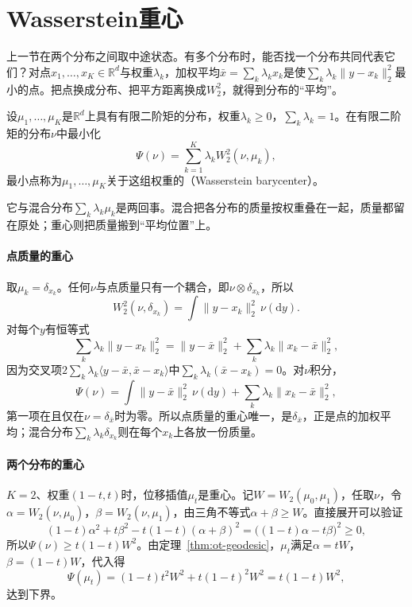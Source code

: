 \section{Wasserstein重心}
\label{sec:ot-barycenter}

上一节在两个分布之间取中途状态。有多个分布时，能否找一个分布共同代表它们？对点$x_1,\dots,x_K\in\mathbb{R}^{d}$与权重$\lambda_k$，加权平均$\bar{x}=\sum_k\lambda_kx_k$是使$\sum_k\lambda_k\lVert y-x_k\rVert_2^{2}$最小的点。把点换成分布、把平方距离换成$W_2^{2}$，就得到分布的“平均”。

\begin{definition}[Wasserstein重心]
\label{def:ot-barycenter}
设$\mu_1,\dots,\mu_K$是$\mathbb{R}^{d}$上具有有限二阶矩的分布，权重$\lambda_k\geq0$，$\sum_k\lambda_k=1$。在有限二阶矩的分布$\nu$中最小化
\begin{equation}
 \Psi(\nu)=\sum_{k=1}^{K}\lambda_kW_2^{2}(\nu,\mu_k),
 \label{eq:ot-barycenter}
\end{equation}
最小点称为$\mu_1,\dots,\mu_K$关于这组权重的（Wasserstein barycenter）。
\end{definition}

它与混合分布$\sum_k\lambda_k\mu_k$是两回事。混合把各分布的质量按权重叠在一起，质量都留在原处；重心则把质量搬到“平均位置”上。

\paragraph{点质量的重心}
取$\mu_k=\delta_{x_k}$。任何$\nu$与点质量只有一个耦合，即$\nu\otimes\delta_{x_k}$，所以
\[
 W_2^{2}(\nu,\delta_{x_k})=\int\lVert y-x_k\rVert_2^{2}\,\nu(\mathrm{d}y).
\]对每个$y$有恒等式
\[
 \sum_k\lambda_k\lVert y-x_k\rVert_2^{2}=\lVert y-\bar{x}\rVert_2^{2}+\sum_k\lambda_k\lVert x_k-\bar{x}\rVert_2^{2},
\]
因为交叉项$2\sum_k\lambda_k\langle y-\bar{x},\bar{x}-x_k\rangle$中$\sum_k\lambda_k(\bar{x}-x_k)=0$。对$\nu$积分，
\[
 \Psi(\nu)=\int\lVert y-\bar{x}\rVert_2^{2}\,\nu(\mathrm{d}y)+\sum_k\lambda_k\lVert x_k-\bar{x}\rVert_2^{2},
\]
第一项在且仅在$\nu=\delta_{\bar{x}}$时为零。所以点质量的重心唯一，是$\delta_{\bar{x}}$，正是点的加权平均；混合分布$\sum_k\lambda_k\delta_{x_k}$则在每个$x_k$上各放一份质量。

\paragraph{两个分布的重心}
$K=2$、权重$(1-t,t)$时，位移插值$\mu_t$是重心。记$W=W_2(\mu_0,\mu_1)$，任取$\nu$，令$\alpha=W_2(\nu,\mu_0)$，$\beta=W_2(\nu,\mu_1)$，由三角不等式$\alpha+\beta\geq W$。直接展开可以验证
\[
 (1-t)\alpha^{2}+t\beta^{2}-t(1-t)(\alpha+\beta)^{2}=\bigl((1-t)\alpha-t\beta\bigr)^{2}\geq0 ,
\]
所以$\Psi(\nu)\geq t(1-t)W^{2}$。由定理~\ref{thm:ot-geodesic}，$\mu_t$满足$\alpha=tW$，$\beta=(1-t)W$，代入得
\[
 \Psi(\mu_t)=(1-t)t^{2}W^{2}+t(1-t)^{2}W^{2}=t(1-t)W^{2},
\]
达到下界。


